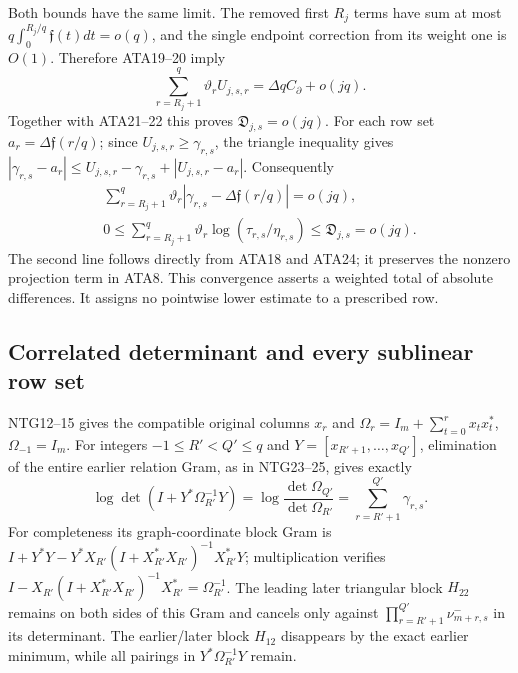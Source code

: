 Both bounds have the same limit.  The removed first $R_j$ terms have
sum at most $q\int_0^{R_j/q}\mathfrak f(t)dt=o(q)$, and the
single endpoint correction from its weight one is $O(1)$.
Therefore ATA19--20 imply
\[
 \sum_{r=R_j+1}^q\vartheta_rU_{j,s,r}
                      =\Delta qC_\partial+o(jq).
\]
Together with ATA21--22 this proves $\mathfrak D_{j,s}=o(jq)$.
For each row set $a_r=\Delta\mathfrak f(r/q)$; since $U_{j,s,r}\ge
\gamma_{r,s}$, the triangle inequality gives
$|\gamma_{r,s}-a_r|\le U_{j,s,r}-\gamma_{r,s}+|U_{j,s,r}-a_r|$.
Consequently
\[
\begin{gathered}
 \sum_{r=R_j+1}^q\vartheta_r
       |\gamma_{r,s}-\Delta\mathfrak f(r/q)|=o(jq),\\
 0\le\sum_{r=R_j+1}^q\vartheta_r
              \log(\tau_{r,s}/\eta_{r,s})
       \le\mathfrak D_{j,s}=o(jq).
\end{gathered}\tag{ATA25}
\]
The second line follows directly from ATA18 and ATA24; it preserves
the nonzero projection term in ATA8.  This convergence asserts a
weighted total of absolute differences.  It assigns no pointwise
lower estimate to a prescribed row.

\subsection{Correlated determinant and every sublinear row set}
NTG12--15 gives the compatible original columns $x_r$ and
$\Omega_r=I_m+\sum_{t=0}^rx_tx_t^*$, $\Omega_{-1}=I_m$.
For integers $-1\le R'<Q'\le q$ and
$Y=[x_{R'+1},\ldots,x_{Q'}]$, elimination of the entire earlier
relation Gram, as in NTG23--25, gives exactly
\[
 \log\det(I+Y^*\Omega_{R'}^{-1}Y)
 =\log\frac{\det\Omega_{Q'}}{\det\Omega_{R'}}
 =\sum_{r=R'+1}^{Q'}\gamma_{r,s}.                       \tag{ATA26}
\]
For completeness its graph-coordinate block Gram is
$I+Y^*Y-Y^*X_{R'}(I+X_{R'}^*X_{R'})^{-1}X_{R'}^*Y$;
multiplication verifies
$I-X_{R'}(I+X_{R'}^*X_{R'})^{-1}X_{R'}^*=\Omega_{R'}^{-1}$.
The leading later triangular block $H_{22}$ remains on both sides
of this Gram and cancels only against
$\prod_{r=R'+1}^{Q'}\nu^-_{m+r,s}$ in its determinant.
The earlier/later block $H_{12}$ disappears by the exact earlier
minimum, while all pairings in $Y^*\Omega_{R'}^{-1}Y$ remain.

